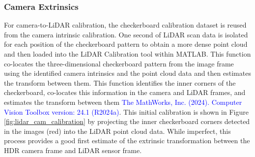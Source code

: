 \documentclass{erauthesis}
\begin{document}
            
\subsubsection{Camera Extrinsics}

For camera-to-LiDAR calibration, the checkerboard calibration dataset is reused from the camera intrinsic calibration.
One second of LiDAR scan data is isolated for each position of the checkerboard pattern to obtain a more dense point cloud and then loaded into the LiDAR Calibration tool within MATLAB.
This function co-locates the three-dimensional checkerboard pattern from the image frame using the identified camera intrinsics and the point cloud data and then estimates the transform between them. 
This function identifies the inner corners of the checkerboard, co-locates this information in the camera and LiDAR frames, and estimates the transform between them \textcolor{blue}{The MathWorks, Inc. (2024). Computer Vision Toolbox version: 24.1 (R2024a)}. 
This initial calibration is shown in Figure \ref{fig:lidar_cam_calibration} by projecting the inner checkerboard corners detected in the images (red) into the LiDAR point cloud data.
While imperfect, this process provides a good first estimate of the extrinsic transformation between the HDR camera frame and LiDAR sensor frame.
\end{document}
